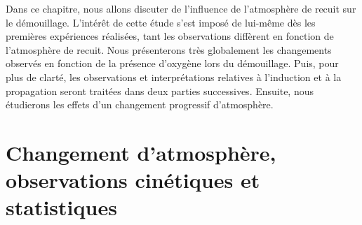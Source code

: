 \newpage\null\thispagestyle{empty}\newpage
\minitoc
\newpage

Dans ce chapitre, nous allons discuter de l'influence de l'atmosphère de recuit sur le démouillage. L'intérêt de cette étude s'est imposé de lui-même dès les premières expériences réalisées, tant les observations diffèrent en fonction de l'atmosphère de recuit. Nous présenterons très globalement les changements observés en fonction de la présence d'oxygène lors du démouillage. Puis, pour plus de clarté, les observations et interprétations relatives à l'induction et à la propagation seront traitées dans deux parties successives. Ensuite, nous étudierons les effets d'un changement progressif d'atmosphère.\par 

\section{Changement d'atmosphère, observations cinétiques et statistiques}

